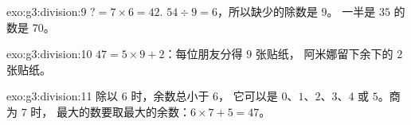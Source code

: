 \begin{solution}{exo:g3:division:9}
$? = 7 \times 6 = 42$. \quad
$54 \div 9 = 6$，所以缺少的除数是 $9$。\quad
一半是 $35$ 的数是 $70$。
\end{solution}

\begin{solution}{exo:g3:division:10}
$47 = 5 \times 9 + 2$：每位朋友分得 $9$ 张贴纸，
阿米娜留下余下的 $2$ 张贴纸。
\end{solution}

\begin{solution}{exo:g3:division:11}
除以 $6$ 时，余数总小于 $6$，
它可以是 $0$、$1$、$2$、$3$、$4$ 或 $5$。商为 $7$ 时，
最大的数要取最大的余数：$6 \times 7 + 5 = 47$。
\end{solution}

